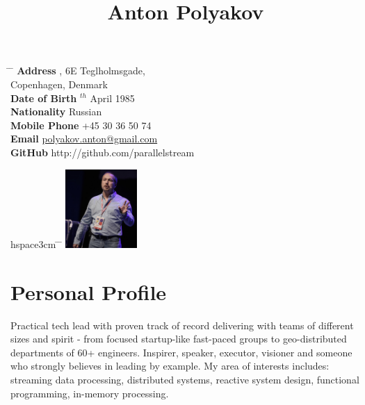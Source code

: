 \documentclass[10pt]{article} %
\begin{document}

\title{Anton Polyakov} %


\parbox{0.5\textwidth}{ %
\begin{tabbing} %
\hspace{3cm} \= \hspace{4cm} \= \kill %
{\bf Address} , 6E Teglholmsgade,\\ %
\> Copenhagen, Denmark \\ %
{\bf Date of Birth} $^{th}$ April 1985 \\ %
{\bf Nationality} \> Russian \\ %
{\bf Mobile Phone} \> +45 30 36 50 74 \\ %
{\bf Email} \> \href{mailto:polyakov.anton@gmail.com}{polyakov.anton@gmail.com} \\ %
{\bf GitHub} \> http://github.com/parallelstream %
\end{tabbing}}
\hfill %
\parbox{0.5\textwidth}{ %
\begin{tabbing} %
hspace{3cm} \= \hspace{4cm} \= \kill %
\includegraphics[height=3cm]{AntonPolyakov.jpg}
\end{tabbing}
}


\section{Personal Profile}
Practical tech lead with proven track of record delivering with teams of different sizes and spirit - from focused startup-like fast-paced groups to geo-distributed departments of 60+ engineers. Inspirer, speaker, executor, visioner and someone who strongly believes in leading by example.
My area of interests includes: streaming data processing, distributed systems, reactive system design, functional programming, in-memory processing.
\end{document}
